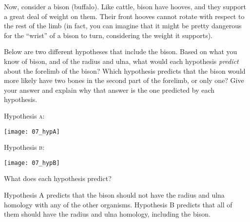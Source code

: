 \documentclass[12pt, hidelinks]{exam}
\newcommand*\AnswerBox[2]{%
    \parbox[t][#1]{0.92\textwidth}{%
    \begin{solution}#2\end{solution}}
    \vspace{\stretch{1}}
}
\begin{document}
\begin{questions}

Now, consider a bison (buffalo). Like cattle, bison have hooves, and they
support a great deal of weight on them. Their front hooves cannot rotate
with respect to the rest of the limb (in fact, you can imagine that it
might be pretty dangerous for the ``wrist'' of a bison to turn,
considering the weight it supports).

Below are two different hypotheses that include the bison. Based 
on what you know of bison, and of the radius and ulna,
what would each hypothesis \emph{predict} about the forelimb of
the bison? Which hypothesis predicts that the bison would more
likely have two bones in the second part of the forelimb, or only one?
Give your answer and explain why that answer is the one predicted by
each hypothesis.

\begin{multicols}{2}

	Hypothesis \textsc{a:} \medskip
	
	\texttt{[image: 07\_hypA]}

	\vspace*{0.5\baselineskip}
	
\columnbreak

	Hypothesis \textsc{b:} \medskip
	
	\texttt{[image: 07\_hypB]} 
	
	\vspace*{\baselineskip}

\end{multicols}

\question
What does each hypothesis predict?

\AnswerBox{5\baselineskip}{Hypothesis A predicts that the bison should not have the radius and ulna homology with any of the other organisms. Hypothesis B predicts that all of them should have the radius
and ulna homology, including the bison.}


\end{questions}
\end{document}
